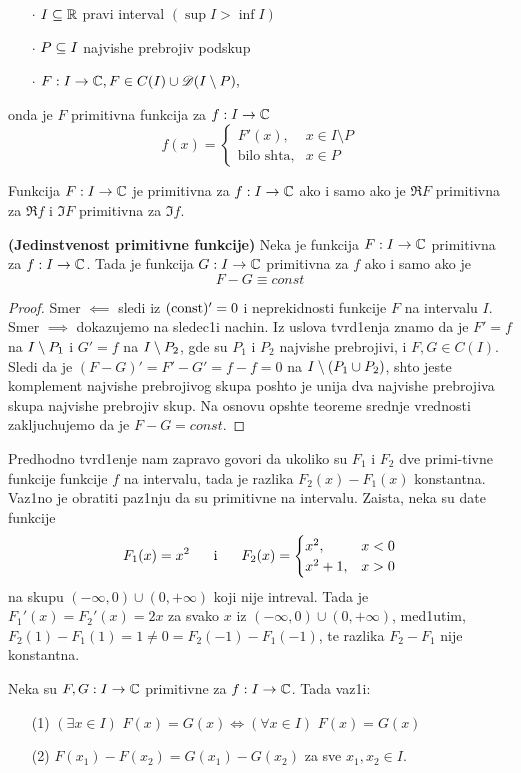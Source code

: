 \documentclass[../main.tex]{subfiles}
\begin{document}
\begin{itemize}
        \item[$\cdot$] $I\subseteq \mathbb{R}$ pravi interval $(\sup I > \inf I)$
        \item[$\cdot$] $P\subseteq I$ najvishe prebrojiv podskup
        \item[$\cdot$] $F:I\to \mathbb{C} , F\in C(I) \cup \mathscr{D}(I\setminus P),$
\end{itemize}
onda je $F$ primitivna funkcija za $f:I\to \mathbb{C}$
$$f(x)=\begin{cases}
			F'(x), & x\in I\setminus P\\
            \textrm{bilo shta}, & x\in P
		 \end{cases}$$
\begin{tvr}
Funkcija $F:I\to \mathbb{C}$ je primitivna za $f:I \to \mathbb{C}$ ako i samo ako je $\Re F$ primitivna za $\Re f$ i $\Im F$ primitivna za $\Im f$.
\end{tvr}
\begin{tvr}
\textbf{(Jedinstvenost primitivne funkcije)} Neka je funkcija $F:I \to \mathbb{C}$ primitivna za $f:I \to \mathbb{C}$. Tada je funkcija $G: I\to \mathbb{C}$ primitivna za $f$ ako i samo ako je 
$$F-G\equiv const$$
\end{tvr}
\begin{proof}
Smer $\impliedby$ sledi iz $(\textrm{\latin{const}})'=0$ i neprekidnosti funkcije $F$ na intervalu $I$. Smer $\implies$ dokazujemo na sledec1i nachin. Iz uslova tvrd1enja znamo da je $F'=f$ na $I\setminus P_1$ i $G'=f$ na $I\setminus P_2$, gde su $P_1$ i $P_2$ najvishe prebrojivi, i $F, G \in C(I)$. Sledi da je $(F-G)'=F'-G'=f-f=0$ na $I\setminus ( P_1 \cup P_2 ) $, shto jeste komplement najvishe prebrojivog skupa poshto je unija dva najvishe prebrojiva skupa najvishe prebrojiv skup. Na osnovu opshte teoreme srednje vrednosti zakljuchujemo da je $F-G= const$.
\end{proof}
\nap Predhodno tvrd1enje nam zapravo govori da ukoliko su $F_1$ i $F_2$ dve primi-tivne funkcije funkcije $f$ na intervalu, tada je razlika $F_2(x)-F_1(x)$ konstantna. Vaz1no je obratiti paz1nju da su primitivne na intervalu. Zaista, neka su date funkcije 
$$ F_1(x)=x^2 \hspace{0.6cm} \text{i} \hspace{0.6cm} F_2(x)= \begin{cases}
			x^2, & x<0\\
            x^2+1, & x>0
		 \end{cases}$$
na skupu $(-\infty,0) \cup (0,+\infty)$ koji nije intreval. Tada je $F_1'(x)=F_2'(x)=2x$ za svako $x$ iz $(-\infty,0) \cup (0,+\infty)$, med1utim, $F_2(1)-F_1(1)=1\ne 0 = F_2(-1)-F_1(-1)$, te razlika $F_2-F_1$ nije konstantna.
\begin{posl}
Neka su $F, G:I \to \mathbb{C}$ primitivne za $f:I\to \mathbb{C}$. Tada vaz1i:
  \begin{itemize}
        \item[(1)] $(\exists x \in I)$  $F(x)=G(x) \iff (\forall x \in I)$  $F(x)=G(x)$
        \item[(2)] $F(x_1)-F(x_2) = G(x_1)-G(x_2)$ za sve $x_1, x_2 \in I$.
  \end{itemize} 
\end{posl}
\end{document}

